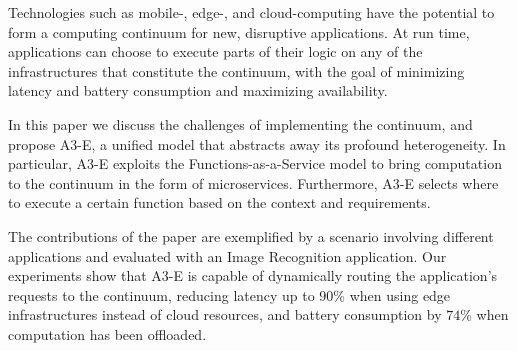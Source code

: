 Technologies such as mobile-, edge-, and cloud-computing have the potential to form a computing continuum for new, disruptive applications. At run time, applications can choose to execute parts of their logic on any of the infrastructures that constitute the continuum, with the goal of minimizing latency and battery consumption and maximizing availability.

In this paper we discuss the challenges of implementing the continuum, and propose A3-E, a unified model that abstracts away its profound heterogeneity. In particular, A3-E exploits the Functions-as-a-Service model to bring computation to the continuum in the form of microservices. Furthermore, A3-E selects where to execute a certain function based on the context and requirements.

The contributions of the paper are exemplified by a scenario involving different applications and evaluated with an Image Recognition application. Our experiments show that A3-E is capable of dynamically routing the application's requests to the continuum, reducing latency up to $90$\% when using edge infrastructures instead of cloud resources, and battery consumption by $74$\% when computation has been offloaded.






